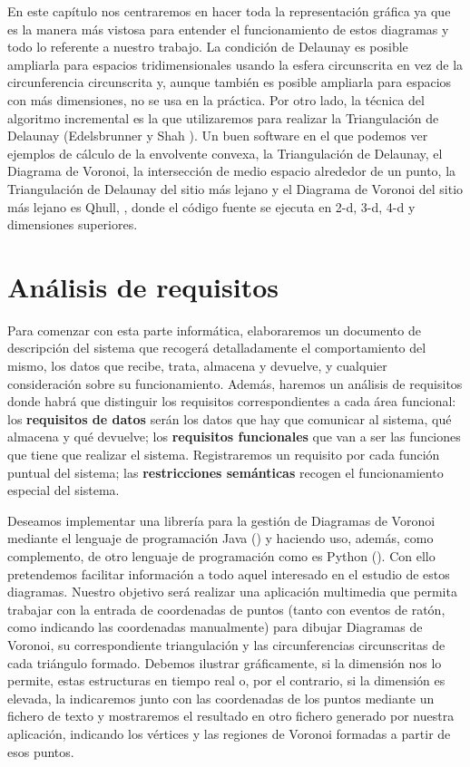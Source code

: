 En este capítulo nos centraremos en hacer toda la representación gráfica ya que es la manera más vistosa para entender el funcionamiento de estos diagramas y todo lo referente a nuestro trabajo. La condición de Delaunay es posible ampliarla para espacios tridimensionales usando la esfera circunscrita en vez de la circunferencia circunscrita y, aunque también es posible ampliarla para espacios con más dimensiones, no se usa en la práctica. 
Por otro lado, la técnica del algoritmo incremental es la que utilizaremos para realizar la Triangulación de Delaunay (Edelsbrunner y Shah \cite{edelshah}).
Un buen software en el que podemos ver ejemplos de cálculo de la envolvente convexa, la Triangulación de Delaunay, el Diagrama de Voronoi, la intersección de medio espacio alrededor de un punto, la Triangulación de Delaunay del sitio más lejano y el Diagrama de Voronoi del sitio más lejano es Qhull, \cite{qhull}, donde el código fuente se ejecuta en 2-d, 3-d, 4-d y dimensiones superiores.

\section{Análisis de requisitos}

Para comenzar con esta parte informática, elaboraremos un documento de descripción del sistema que recogerá detalladamente el comportamiento del mismo, los datos que recibe, trata, almacena y devuelve, y cualquier consideración sobre su funcionamiento. Además, haremos un análisis de requisitos donde habrá que distinguir los requisitos correspondientes a cada área funcional: los \textbf{requisitos de datos} serán los datos que hay que comunicar al sistema, qué almacena y qué devuelve; los \textbf{requisitos funcionales} que van a ser las funciones que tiene que realizar el sistema. Registraremos un requisito por cada función puntual del sistema; las \textbf{restricciones semánticas} recogen el funcionamiento especial del sistema.
\vspace{0.3cm}

Deseamos implementar una librería para la gestión de Diagramas de Voronoi mediante el lenguaje de programación Java (\cite{java2}) y haciendo uso, además, como complemento, de otro lenguaje de programación como es Python (\cite{python}). Con ello pretendemos facilitar información a todo aquel interesado en el estudio de estos diagramas. Nuestro objetivo será realizar una aplicación multimedia que permita trabajar con la entrada de coordenadas de puntos (tanto con eventos de ratón, como indicando las coordenadas manualmente) para dibujar Diagramas de Voronoi, su correspondiente triangulación y las circunferencias circunscritas de cada triángulo formado. Debemos ilustrar gráficamente, si la dimensión nos lo permite, estas estructuras en tiempo real o, por el contrario, si la dimensión es elevada, la indicaremos junto con las coordenadas de los puntos mediante un fichero de texto y mostraremos el resultado en otro fichero generado por nuestra aplicación, indicando los vértices y las regiones de Voronoi formadas a partir de esos puntos. 

